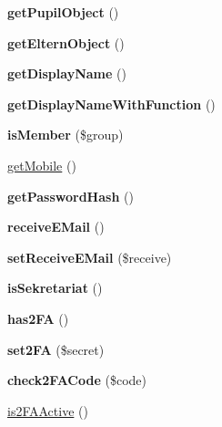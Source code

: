 \begin{DoxyCompactItemize}
{\bfseries get\+Pupil\+Object} ()
\item 
\mbox{\label{classuser_a7161cec206dc661673c483c62da82e5b}} 
{\bfseries get\+Eltern\+Object} ()
\item 
\mbox{\label{classuser_abb1f3bd37338265b77032217100262c2}} 
{\bfseries get\+Display\+Name} ()
\item 
\mbox{\label{classuser_a1d82d453eae0955e10aedf59e282a9d4}} 
{\bfseries get\+Display\+Name\+With\+Function} ()
\item 
\mbox{\label{classuser_a9594da62eead0ec1d0f6cf9b7d369c22}} 
{\bfseries is\+Member} (\$group)
\item 
\mbox{\hyperlink{classuser_a76dafe0634df22989f5641b832cd78c9}{get\+Mobile}} ()
\item 
\mbox{\label{classuser_aae32a636c46cb5c9d4a654381ac72315}} 
{\bfseries get\+Password\+Hash} ()
\item 
\mbox{\label{classuser_a691c9bac0c51af66a74b14268b0470c8}} 
{\bfseries receive\+E\+Mail} ()
\item 
\mbox{\label{classuser_a233a9eba3b6b3ff8d7fcdb1ac5a49b28}} 
{\bfseries set\+Receive\+E\+Mail} (\$receive)
\item 
\mbox{\label{classuser_a8a58bd12006cd8b150ce8f541b0b699d}} 
{\bfseries is\+Sekretariat} ()
\item 
\mbox{\label{classuser_a1daa8092f30e6870a606ab156aee8cc6}} 
{\bfseries has2\+FA} ()
\item 
\mbox{\label{classuser_ae7b1c06d7bb4c3bd09d00e89c15d6cfd}} 
{\bfseries set2\+FA} (\$secret)
\item 
\mbox{\label{classuser_a00327bf7bb89ed06ed84d7f6f44e8b7e}} 
{\bfseries check2\+F\+A\+Code} (\$code)
\item 
\mbox{\hyperlink{classuser_abf151c3ec6caaf5c0ca2127a6cef7ae7}{is2\+F\+A\+Active}} ()
\item 
\mbox{\label{classuser_a5d8aee2666ea512fcf95de77866eb99a}} 

\end{DoxyCompactItemize}
